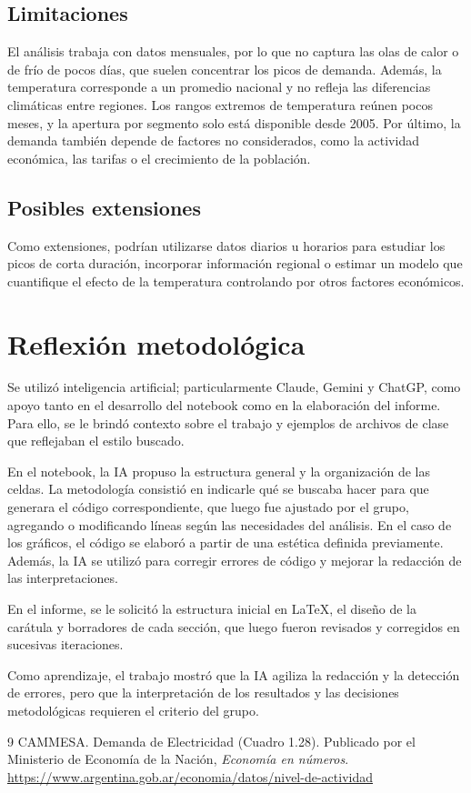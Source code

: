 \documentclass[10pt,a4paper]{article}
\begin{document}
\subsection{Limitaciones}
El análisis trabaja con datos mensuales, por lo que no captura las olas de calor o de frío de pocos días, que suelen concentrar los picos de demanda. Además, la temperatura corresponde a un promedio nacional y no refleja las diferencias climáticas entre regiones. Los rangos extremos de temperatura reúnen pocos meses, y la apertura por segmento solo está disponible desde 2005. Por último, la demanda también depende de factores no considerados, como la actividad económica, las tarifas o el crecimiento de la población.

\subsection{Posibles extensiones}
Como extensiones, podrían utilizarse datos diarios u horarios para estudiar los picos de corta duración, incorporar información regional o estimar un modelo que cuantifique el efecto de la temperatura controlando por otros factores económicos.

\section{Reflexión metodológica}\label{sec:reflexion}
Se utilizó inteligencia artificial; particularmente Claude, Gemini y ChatGP, como apoyo tanto en el desarrollo del notebook como en la elaboración del informe. Para ello, se le brindó contexto sobre el trabajo y ejemplos de archivos de clase que reflejaban el estilo buscado.

En el notebook, la IA propuso la estructura general y la organización de las celdas. La metodología consistió en indicarle qué se buscaba hacer para que generara el código correspondiente, que luego fue ajustado por el grupo, agregando o modificando líneas según las necesidades del análisis. En el caso de los gráficos, el código se elaboró a partir de una estética definida previamente. Además, la IA se utilizó para corregir errores de código y mejorar la redacción de las interpretaciones.

En el informe, se le solicitó la estructura inicial en \LaTeX, el diseño de la carátula y borradores de cada sección, que luego fueron revisados y corregidos en sucesivas iteraciones.

Como aprendizaje, el trabajo mostró que la IA agiliza la redacción y la detección de errores, pero que la interpretación de los resultados y las decisiones metodológicas requieren el criterio del grupo.

\begin{thebibliography}{9}
CAMMESA. Demanda de Electricidad (Cuadro 1.28). Publicado por el Ministerio de Economía de la Nación, \textit{Economía en números}. \url{https://www.argentina.gob.ar/economia/datos/nivel-de-actividad}
\end{thebibliography}
\end{document}
